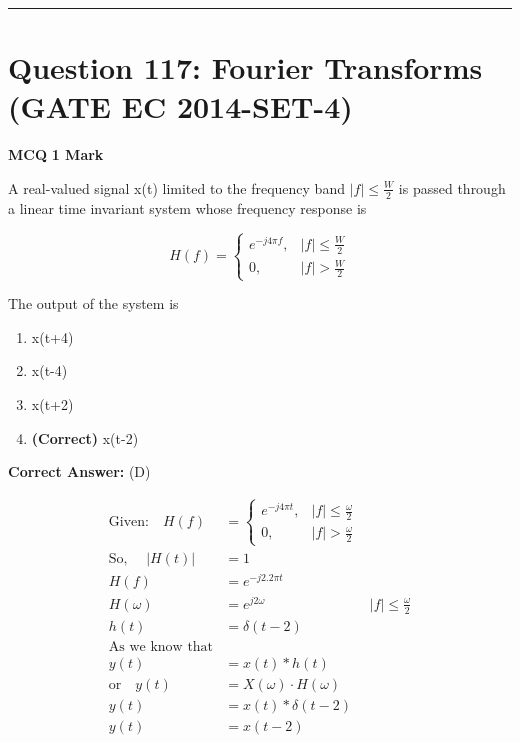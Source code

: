 \documentclass[11pt,a4paper]{article}
\begin{document}
\vspace{1.5em}
\hrule
\vspace{1.5em}

\section*{Question 117: Fourier Transforms (GATE EC 2014-SET-4)}
\noindent \textbf{\color{primary}MCQ} \hfill \textbf{\color{secondary}1 Mark}


\noindent A real-valued signal x(t) limited to the frequency band $|f|\leq \frac{W}{2}$ is passed through a linear time invariant system whose frequency response is 

\[
H(f)=\left\{\begin{matrix} e^{-j4\pi f}, &|f|\leq \frac{W}{2} \\ 0, & |f|> \frac{W}{2} \end{matrix}\right.
\]
 
The output of the system is


\begin{enumerate}[label=(\Alph*)]
    \item x(t+4)
    \item x(t-4)
    \item x(t+2)
    \item \textbf{(Correct)} x(t-2)
\end{enumerate}

\noindent \textbf{Correct Answer:} (D)

\begin{tcolorbox}[solbox, title=Detailed Solution -- Question 117]
\[
\begin{aligned} \text{Given:} \quad H(f)&=\left\{\begin{array}{cc}e^{-j 4 \pi t}, & |f| \leq \frac{\omega}{2} \\ 0, & |f|>\frac{\omega}{2}\end{array}\right. \\ \text{So, } \quad|H(t)|&=1 \\ H(f)&=e^{-j 2.2 \pi t} \\ H(\omega)&=e^{j 2 \omega} &|f| \leq \frac{\omega}{2} \\ h(t)&=\delta(t-2)\\ \text{As we know that}\\ y(t)&=x(t) * h(t)\\ \text{or}\quad y(t)&=X(\omega) \cdot H(\omega) \\ y(t)&=x(t) * \delta(t-2) \\ y(t)&=x(t-2) \end{aligned}
\]
\end{tcolorbox}
\end{document}
